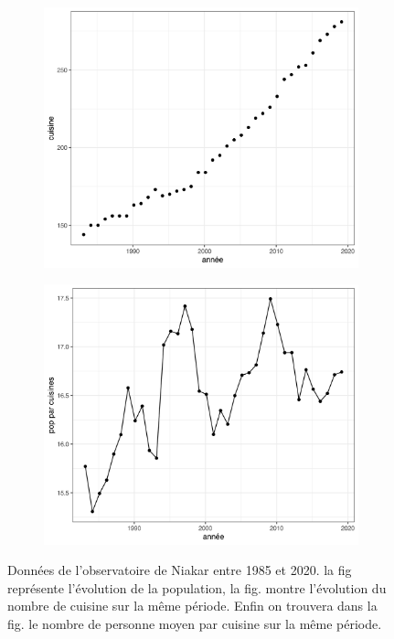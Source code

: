 \begin{figure}
\begin{subfigure}[b]{0.45\textwidth}
         \includegraphics[width=\textwidth]{img/cuisine1995-2020_diohine.png}
         \caption{}
         \label{fig:cuisines}
     \end{subfigure}
     \begin{subfigure}[b]{0.45\textwidth}
         \centering
         \includegraphics[width=\textwidth]{img/popParCuisine1995-2020_diohine.png}
         \caption{}
         \label{fig:tailleCuisines}
     \end{subfigure}
        \caption{Données de l'observatoire de Niakar entre 1985 et 2020. la fig  représente l'évolution de la population, la fig.  montre l'évolution du nombre de cuisine sur la même période. Enfin on trouvera dans la fig.  le nombre de personne moyen par cuisine sur la même période.}
        \label{fig:obsNiakhar}
\end{figure}


